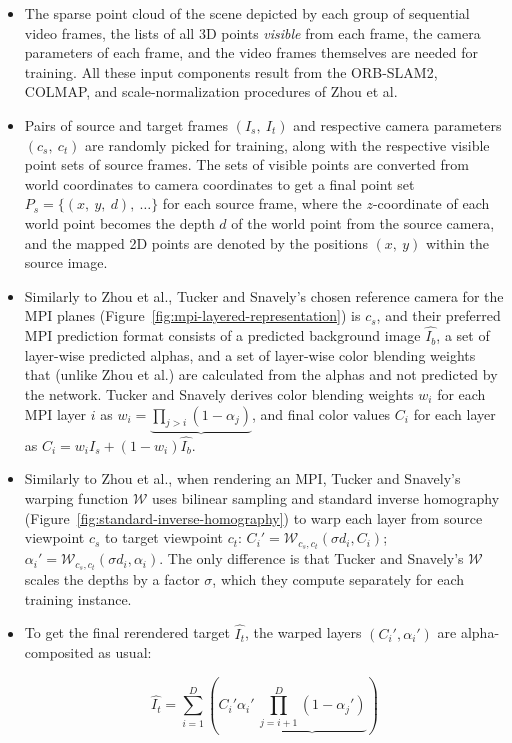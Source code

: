 \begin{itemize}
    \item The sparse point cloud of the scene depicted by each group of sequential video frames, the lists of all 3D points \textit{visible} from each frame, the camera parameters of each frame, and the video frames themselves are needed for training. All these input components result from the ORB-SLAM2, COLMAP, and scale-normalization procedures of Zhou et al.
    \item Pairs of source and target frames $(I_s,\ I_t)$ and respective camera parameters $(c_s,\ c_t)$ are randomly picked for training, along with the respective visible point sets of source frames. The sets of visible points are converted from world coordinates to camera coordinates to get a final point set $P_s = \{(x,\ y,\ d),\ \ldots\}$ for each source frame, where the $z$-coordinate of each world point becomes the depth $d$ of the world point from the source camera, and the mapped 2D points are denoted by the positions $(x,\ y)$ within the source image. 
    \item Similarly to Zhou et al., Tucker and Snavely's chosen reference camera for the MPI planes (Figure~\ref{fig:mpi-layered-representation}) is $c_s$, and their preferred MPI prediction format consists of a predicted background image $\hat{I_b}$, a set of layer-wise predicted alphas, and a set of layer-wise color blending weights that (unlike Zhou et al.) are calculated from the alphas and not predicted by the network. Tucker and Snavely derives color blending weights $w_i$ for each MPI layer $i$ as $w_i = \underbrace{\prod_{j>i} (1 - \alpha_j)}$, and final color values $C_i$ for each layer as $C_i = w_i I_s + (1 - w_i) \hat{I_b}$.
    \item Similarly to Zhou et al., when rendering an MPI, Tucker and Snavely's warping function $\mathcal{W}$ uses bilinear sampling and standard inverse homography (Figure~\ref{fig:standard-inverse-homography}) to warp each layer from source viewpoint $c_s$ to target viewpoint $c_t$: $C_i' = \mathcal{W}_{c_s, c_t}(\sigma d_i, C_i)$; $\alpha_i' = \mathcal{W}_{c_s, c_t}(\sigma d_i, \alpha_i)$. The only difference is that Tucker and Snavely's $\mathcal{W}$ scales the depths by a factor $\sigma$, which they compute separately for each training instance.
    \item To get the final rerendered target $\hat{I_t}$, the warped layers $(C_i', \alpha_i')$ are alpha-composited as usual:
    
    \begin{equation}\label{eq:rerendered-target}
    \hat{I_t} = \sum_{i=1}^D \left(C_i' \alpha_i'\ \underbrace{\prod_{j=i+1}^D (1 - \alpha_j')}\right)
    \end{equation}
    

\end{itemize}
